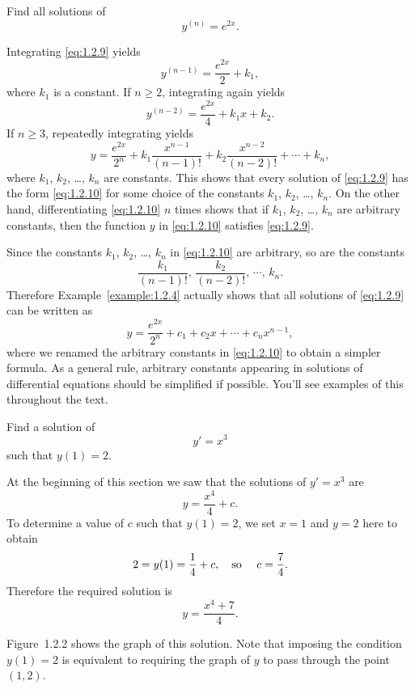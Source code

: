 \setcounter{example}{3}
\setcounter{equation}{8}
\begin{example}
  \label{example:1.2.4} \rm Find all solutions of
  \begin{equation}
    \label{eq:1.2.9}y^{(n)}=e^{2x}.
  \end{equation}
\end{example}
\setcounter{equation}{9}
\begin{examplesolution}
\solution Integrating \eqref{eq:1.2.9} yields
\[
  y^{(n-1)}=\frac{e^{2x}}{2}+k_{1},
\]
where $k_{1}$ is a constant. If $n\ge2$, integrating again yields
\[
  y^{(n-2)}=\frac{e^{2x}}{4}+k_{1}x+k_{2}.
\]
If $n\ge3$, repeatedly integrating yields
\begin{equation}
  \label{eq:1.2.10}y=\frac{e^{2x}}{2^{n}}+k_{1}\frac{x^{n-1}}{(n-1)!}+k_{2}\frac{x^{n-2}}{(n-2)!}+\cdots+k_{n},
\end{equation}
where $k_{1}$, $k_{2}$, \dots, $k_{n}$ are constants. This shows that every solution of
\eqref{eq:1.2.9} has the form \eqref{eq:1.2.10} for some choice of the constants $k_{1}$, $k_{2}$,
\dots, $k_{n}$. On the other hand, differentiating \eqref{eq:1.2.10} $n$ times shows that if
$k_{1}$, $k_{2}$, \dots, $k_{n}$ are arbitrary constants, then the function $y$ in \eqref{eq:1.2.10}
satisfies \eqref{eq:1.2.9}.

Since the constants $k_{1}$, $k_{2}$, \dots, $k_{n}$ in \eqref{eq:1.2.10} are arbitrary, so are the
constants
\[
  \frac{k_{1}}{(n-1)!},\,\frac{k_{2}}{(n-2)!},\,\cdots,\,k_{n}.
\]
Therefore Example~\ref{example:1.2.4} actually shows that all solutions of \eqref{eq:1.2.9} can be
written as
\[
  y=\frac{e^{2x}}{2^{n}}+c_{1}+c_{2}x+\cdots+c_{n}x^{n-1},
\]
where we renamed the arbitrary constants in \eqref{eq:1.2.10} to obtain a simpler formula. As a
general rule, arbitrary constants appearing in solutions of differential equations should be
simplified if possible. You'll see examples of this throughout the text.
\end{examplesolution}

\setcounter{example}{4}
\begin{example}
  \label{example:1.2.5} \rm Find a solution of
  \[
    y'=x^{3}
  \]
  such that $y(1)=2$.
\end{example}
\begin{examplesolution}
\solution At the beginning of this section we saw that the solutions of $y'=x^{3}$ are
\[
  y=\frac{x^{4}}{4}+c.
\]
To determine a value of $c$ such that $y(1)=2$, we set $x=1$ and $y=2$ here to obtain
\[
  2=y(1)=\frac{1}{4}+c,\mbox{\quad so \quad}c=\frac{7}{4}.
\]
Therefore the required solution is
\[
  y=\frac{x^{4}+7}{4}.
\]

Figure~1.2.2 shows the graph of this solution. Note that imposing the condition
$y(1)=2$ is equivalent to requiring the graph of $y$ to pass through the point $(1,2)$.
\end{examplesolution}

